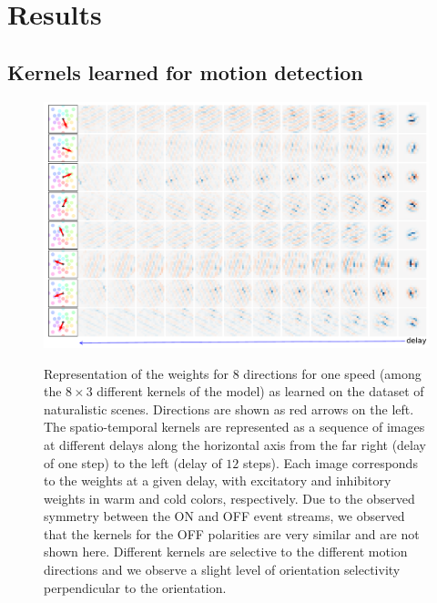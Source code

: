 \documentclass[default]{sn-jnl}%
\theoremstyle{thmstyleone}%
\theoremstyle{thmstyletwo}%
\theoremstyle{thmstylethree}%
\begin{document}
\section{Results}
\label{sec:results}
\subsection{Kernels learned for motion detection}
\begin{figure}[ht!]
    {\centering
    \includegraphics[width=\linewidth]{figures/motion_kernels.pdf}
    }
    \caption{
    	Representation of the weights for $8$ directions for one speed (among the $8 \times 3$ different kernels of the model) as learned on the dataset of naturalistic scenes. Directions are shown as red arrows on the left. The spatio-temporal kernels are represented as a sequence of images at different delays along the horizontal axis from the far right (delay of one step) to the left (delay of $12$ steps). Each image corresponds to the weights at a given delay, with excitatory and inhibitory weights in warm and cold colors, respectively. Due to the observed symmetry between the ON and OFF event streams, we observed that the kernels for the OFF polarities are very similar and are not shown here.	Different kernels are selective to the different motion directions and we observe a slight level of orientation selectivity perpendicular to the orientation. 
	}
    \label{fig:kernels}
\end{figure} 
\end{document}
